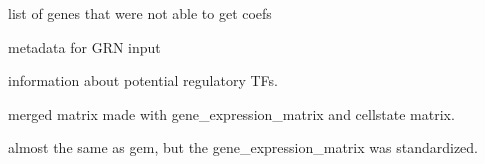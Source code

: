 \documentclass[letterpaper,10pt,english]{sphinxmanual}
\begin{document}
\begin{fulllineitems}
\begin{fulllineitems}
\end{fulllineitems}


\begin{fulllineitems}
\label{\detokenize{modules/celloracle:celloracle.Net.failed_genes}}
 \textendash{} list of genes that were not able to get coefs

\end{fulllineitems}


\begin{fulllineitems}
\label{\detokenize{modules/celloracle:celloracle.Net.cellstate}}
 \textendash{} metadata for GRN input

\end{fulllineitems}


\begin{fulllineitems}
\label{\detokenize{modules/celloracle:celloracle.Net.TFinfo}}
 \textendash{} information about potential regulatory TFs.

\end{fulllineitems}


\begin{fulllineitems}
\label{\detokenize{modules/celloracle:celloracle.Net.gem}}
 \textendash{} merged matrix made with gene\_expression\_matrix and cellstate matrix.

\end{fulllineitems}


\begin{fulllineitems}
\label{\detokenize{modules/celloracle:celloracle.Net.gem_standerdized}}
 \textendash{} almost the same as gem, but the gene\_expression\_matrix was standardized.


\end{fulllineitems}
\end{fulllineitems}
\end{document}
